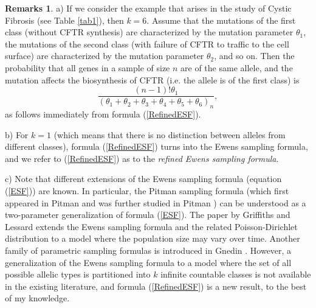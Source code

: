 \documentclass[12pt]{amsart}
\theoremstyle{definition}
\newtheorem*{Remarks}{Remarks}
\numberwithin{equation}{section}
\begin{document}
\begin{Remarks}
a) If we consider the example that arises in the study of Cystic Fibrosis (see  Table \ref{tab1}), then $k=6$. Assume that the mutations of the first class (without CFTR synthesis) are characterized
by the mutation parameter $\theta_1$, the mutations of the second class (with failure of CFTR
to traffic to the cell surface) are characterized by the mutation parameter $\theta_2$, and so on.
Then the probability that all genes in a sample of size $n$ are of the same allele, and the mutation affects the biosynthesis of CFTR (i.e. the allele is of the first class) is
$$
\frac{(n-1)!\theta_1}{\left(\theta_1+\theta_2+\theta_3+\theta_4+\theta_5+\theta_6\right)_n},
$$
as follows immediately from formula (\ref{RefinedESF}).

b) For $k=1$ (which means that there is no distinction between alleles from different classes), formula (\ref{RefinedESF}) turns into the Ewens sampling formula, and we refer to (\ref{RefinedESF}) as to the \textit{refined Ewens sampling formula}.

c) Note that different extensions of the Ewens sampling formula (equation (\ref{ESF})) are known.
In particular, the Pitman sampling formula (which first appeared in Pitman \cite{Pitman1} and was
further studied in Pitman \cite{Pitman2}) can be understood as a two-parameter generalization of
formula (\ref{ESF}). The paper by Griffiths and Lessard \cite{GriffithsLessard} extends the Ewens sampling formula and the related Poisson-Dirichlet distribution to a model where the population size may vary over time. Another family of parametric sampling formulas is introduced in Gnedin \cite{Gnedin}. However, a generalization of the Ewens sampling formula to a model where the set of all possible allelic types is partitioned into $k$ infinite countable classes is not available in the existing literature, and formula (\ref{RefinedESF}) is a new result,
to the best of my knowledge.
\end{Remarks}
\end{document}
